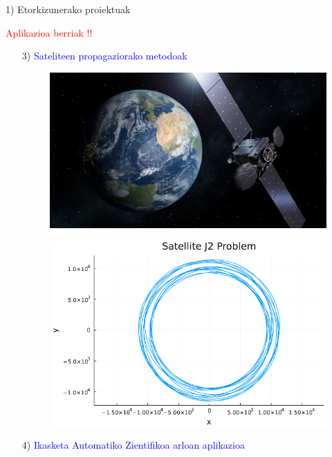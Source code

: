 \documentclass[
 10pt,%
 compress,%
 t,       %
 xcolor=svgnames
]{beamer}
\theoremstyle{definition} \newtheorem{definicion}{Definicion}[section]
\theoremstyle{propiedades} \newtheorem{propiedades}{Propiedades}[section]
\begin{document}
\begin{frame}[fragile]{1) Etorkizunerako proiektuak} 	
	
	
	\medskip
	\small


\textcolor{red}{Aplikazioa berriak !!}	

\medskip

\begin{itemize}
	\item[3)]  	\textcolor{blue}{ Sateliteen propagaziorako metodoak}
	
\medskip


\begin{figure}
\begin{minipage}{.45\textwidth}
	\colorbox{white} 
	{\includegraphics[width=0.8\linewidth]{SmallGEO_Hispasat_36W-1_pillars}}
\end{minipage}
%
\begin{minipage}{0.45\textwidth}
	\colorbox{white}  {\includegraphics[width=0.8\linewidth]{J2 VOP Problem}}
\end{minipage}
\end{figure}

\medskip

\item[4)] 	\textcolor{blue}{Ikasketa Automatiko Zientifikoa arloan aplikazioa}



\end{itemize}
\end{frame}
\end{document}
